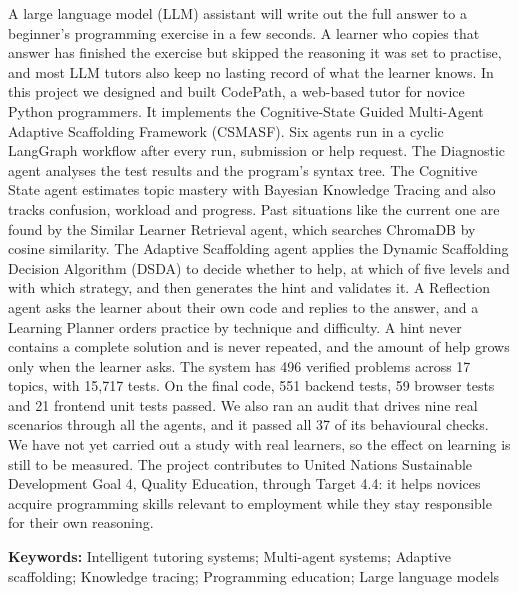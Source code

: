 A large language model (LLM) assistant will write out the full answer to a beginner's programming exercise in a few seconds. A learner who copies that answer has finished the exercise but skipped the reasoning it was set to practise, and most LLM tutors also keep no lasting record of what the learner knows. In this project we designed and built CodePath, a web-based tutor for novice Python programmers. It implements the Cognitive-State Guided Multi-Agent Adaptive Scaffolding Framework (CSMASF). Six agents run in a cyclic LangGraph workflow after every run, submission or help request. The Diagnostic agent analyses the test results and the program's syntax tree. The Cognitive State agent estimates topic mastery with Bayesian Knowledge Tracing and also tracks confusion, workload and progress. Past situations like the current one are found by the Similar Learner Retrieval agent, which searches ChromaDB by cosine similarity. The Adaptive Scaffolding agent applies the Dynamic Scaffolding Decision Algorithm (DSDA) to decide whether to help, at which of five levels and with which strategy, and then generates the hint and validates it. A Reflection agent asks the learner about their own code and replies to the answer, and a Learning Planner orders practice by technique and difficulty. A hint never contains a complete solution and is never repeated, and the amount of help grows only when the learner asks. The system has 496 verified problems across 17 topics, with 15,717 tests. On the final code, 551 backend tests, 59 browser tests and 21 frontend unit tests passed. We also ran an audit that drives nine real scenarios through all the agents, and it passed all 37 of its behavioural checks. We have not yet carried out a study with real learners, so the effect on learning is still to be measured. The project contributes to United Nations Sustainable Development Goal 4, Quality Education, through Target 4.4: it helps novices acquire programming skills relevant to employment while they stay responsible for their own reasoning.

\vspace{0.3cm}
\textbf{Keywords:} Intelligent tutoring systems; Multi-agent systems; Adaptive scaffolding; Knowledge tracing; Programming education; Large language models
